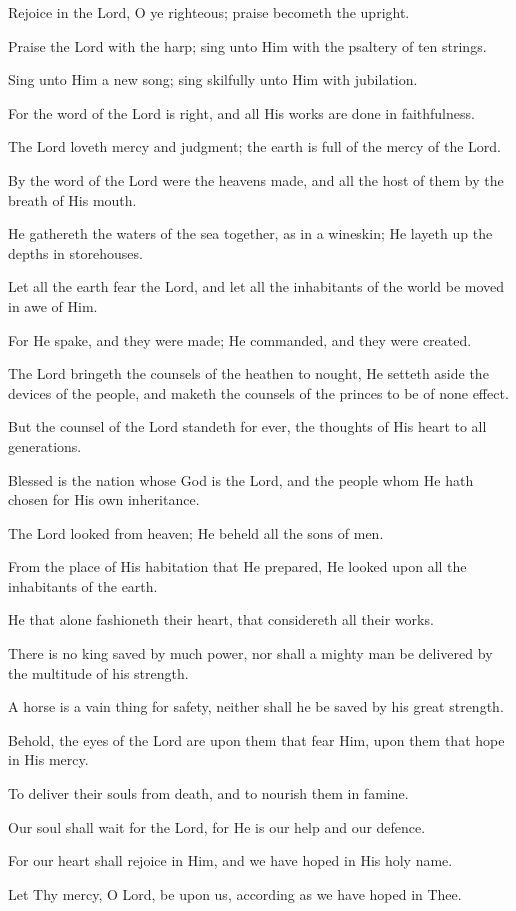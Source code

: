 Rejoice in the Lord, O ye righteous; praise becometh the upright.

Praise the Lord with the harp; sing unto Him with the psaltery of ten strings.

Sing unto Him a new song; sing skilfully unto Him with jubilation.

For the word of the Lord is right, and all His works are done in faithfulness.

The Lord loveth mercy and judgment; the earth is full of the mercy of the Lord.

By the word of the Lord were the heavens made, and all the host of them by the breath of His mouth.

He gathereth the waters of the sea together, as in a wineskin; He layeth up the depths in storehouses.

Let all the earth fear the Lord, and let all the inhabitants of the world be moved in awe of Him.

For He spake, and they were made; He commanded, and they were created.

The Lord bringeth the counsels of the heathen to nought, He setteth aside the devices of the people, and maketh the counsels of the princes to be of none effect.

But the counsel of the Lord standeth for ever, the thoughts of His heart to all generations.

Blessed is the nation whose God is the Lord, and the people whom He hath chosen for His own inheritance.

The Lord looked from heaven; He beheld all the sons of men.

From the place of His habitation that He prepared, He looked upon all the inhabitants of the earth.

He that alone fashioneth their heart, that considereth all their works.

There is no king saved by much power, nor shall a mighty man be delivered by the multitude of his strength.

A horse is a vain thing for safety, neither shall he be saved by his great strength.

Behold, the eyes of the Lord are upon them that fear Him, upon them that hope in His mercy.

To deliver their souls from death, and to nourish them in famine.

Our soul shall wait for the Lord, for He is our help and our defence.

For our heart shall rejoice in Him, and we have hoped in His holy name.

Let Thy mercy, O Lord, be upon us, according as we have hoped in Thee.
